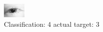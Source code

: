 \begin{figure}[h!]
\begin{center}
\includegraphics[width=0.60\columnwidth]{figures/ID7_class_4_target_3.png}
\end{center}
\caption{ Classification: 4 actual target: 3}
\label{fig:ID7_class_4_target_3}
\end{figure}
